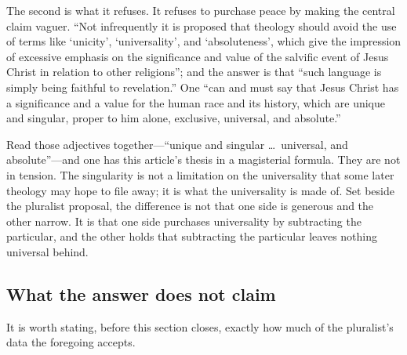 The second is what it refuses. It refuses to purchase peace by making the central claim vaguer. ``Not infrequently it is proposed that theology should avoid the use of terms like `unicity', `universality', and `absoluteness', which give the impression of excessive emphasis on the significance and value of the salvific event of Jesus Christ in relation to other religions''; and the answer is that ``such language is simply being faithful to revelation.'' One ``can and must say that Jesus Christ has a significance and a value for the human race and its history, which are unique and singular, proper to him alone, exclusive, universal, and absolute.''

Read those adjectives together---``unique and singular \ldots\ universal, and absolute''---and one has this article's thesis in a magisterial formula. They are not in tension. The singularity is not a limitation on the universality that some later theology may hope to file away; it is what the universality is made of. Set beside the pluralist proposal, the difference is not that one side is generous and the other narrow. It is that one side purchases universality by subtracting the particular, and the other holds that subtracting the particular leaves nothing universal behind.

\subsection{What the answer does not claim}

It is worth stating, before this section closes, exactly how much of the pluralist's data the foregoing accepts.

